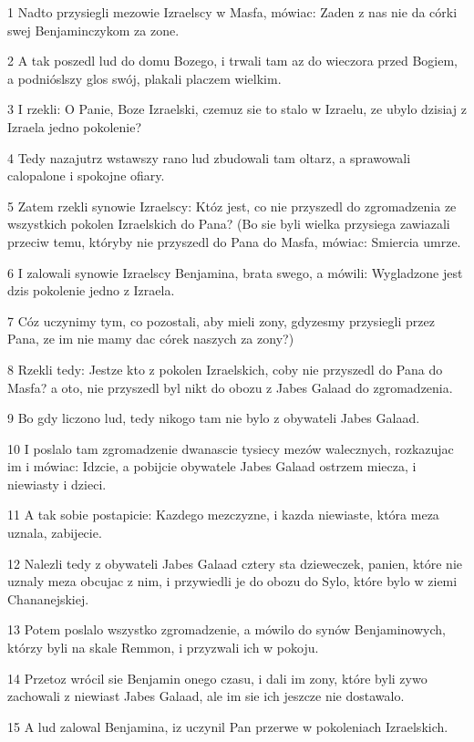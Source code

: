 \par 1 Nadto przysiegli mezowie Izraelscy w Masfa, mówiac: Zaden z nas nie da córki swej Benjaminczykom za zone.
\par 2 A tak poszedl lud do domu Bozego, i trwali tam az do wieczora przed Bogiem, a podnióslszy glos swój, plakali placzem wielkim.
\par 3 I rzekli: O Panie, Boze Izraelski, czemuz sie to stalo w Izraelu, ze ubylo dzisiaj z Izraela jedno pokolenie?
\par 4 Tedy nazajutrz wstawszy rano lud zbudowali tam oltarz, a sprawowali calopalone i spokojne ofiary.
\par 5 Zatem rzekli synowie Izraelscy: Któz jest, co nie przyszedl do zgromadzenia ze wszystkich pokolen Izraelskich do Pana? (Bo sie byli wielka przysiega zawiazali przeciw temu, któryby nie przyszedl do Pana do Masfa, mówiac: Smiercia umrze.
\par 6 I zalowali synowie Izraelscy Benjamina, brata swego, a mówili: Wygladzone jest dzis pokolenie jedno z Izraela.
\par 7 Cóz uczynimy tym, co pozostali, aby mieli zony, gdyzesmy przysiegli przez Pana, ze im nie mamy dac córek naszych za zony?)
\par 8 Rzekli tedy: Jestze kto z pokolen Izraelskich, coby nie przyszedl do Pana do Masfa? a oto, nie przyszedl byl nikt do obozu z Jabes Galaad do zgromadzenia.
\par 9 Bo gdy liczono lud, tedy nikogo tam nie bylo z obywateli Jabes Galaad.
\par 10 I poslalo tam zgromadzenie dwanascie tysiecy mezów walecznych, rozkazujac im i mówiac: Idzcie, a pobijcie obywatele Jabes Galaad ostrzem miecza, i niewiasty i dzieci.
\par 11 A tak sobie postapicie: Kazdego mezczyzne, i kazda niewiaste, która meza uznala, zabijecie.
\par 12 Nalezli tedy z obywateli Jabes Galaad cztery sta dzieweczek, panien, które nie uznaly meza obcujac z nim, i przywiedli je do obozu do Sylo, które bylo w ziemi Chananejskiej.
\par 13 Potem poslalo wszystko zgromadzenie, a mówilo do synów Benjaminowych, którzy byli na skale Remmon, i przyzwali ich w pokoju.
\par 14 Przetoz wrócil sie Benjamin onego czasu, i dali im zony, które byli zywo zachowali z niewiast Jabes Galaad, ale im sie ich jeszcze nie dostawalo.
\par 15 A lud zalowal Benjamina, iz uczynil Pan przerwe w pokoleniach Izraelskich.
